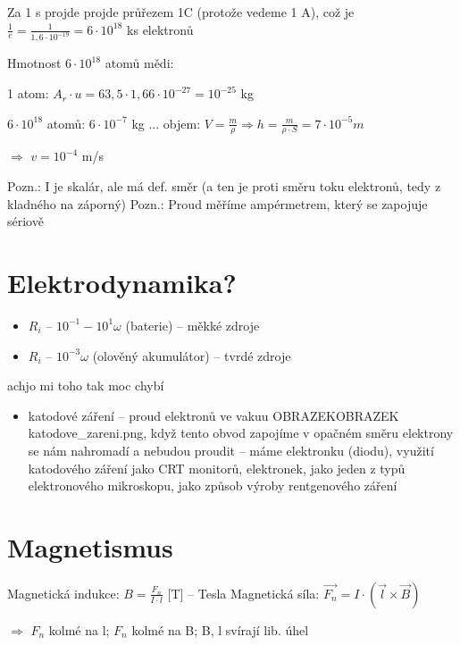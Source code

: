 \documentclass{article}
\begin{document}
Za 1 s projde projde průřezem 1C (protože vedeme 1 A), což je $\frac{1}{e} = \frac{1}{1,6\cdot 10^{-19}} = 6\cdot 10^{18}$ ks elektronů

Hmotnost $6\cdot10^{18}$ atomů mědi:

  \hspace{10 pt} 1 atom: $A_r \cdot u = 63,5 \cdot 1,66 \cdot 10^{-27} = 10^{-25}$ kg

  \hspace{10 pt} $6 \cdot 10^{18}$ atomů: $6 \cdot 10^{-7}$ kg ... objem: $V = \frac{m}{\rho} \Rightarrow h = \frac{m}{\rho \cdot S} = 7 \cdot 10^{-5} m$

\hspace{-10 pt} $\Rightarrow$ $v = 10^{-4} $ m/s

Pozn.: I je skalár, ale má def. směr (a ten je proti směru toku elektronů, tedy z kladného na záporný)
Pozn.: Proud měříme ampérmetrem, který se zapojuje sériově

\part{Elektrodynamika?}
\begin{itemize}
  \item $R_i$ -- $10^{-1} - 10^{1} \omega$ (baterie) -- měkké zdroje
  \item $R_i$ -- $10^{-3} \omega$ (olověný akumulátor) -- tvrdé zdroje
\end{itemize}

achjo mi toho tak moc chybí
\begin{itemize}
  \item katodové záření -- proud elektronů ve vakuu OBRAZEKOBRAZEK katodove\_zareni.png, když tento obvod zapojíme v opačném směru elektrony se nám nahromadí a nebudou proudit -- máme elektronku (diodu), využití katodového záření jako CRT monitorů, elektronek, jako jeden z typů elektronového mikroskopu, jako způsob výroby rentgenového záření
\end{itemize}

\newpage
\part{Magnetismus}

Magnetická indukce: $B = \frac{F_n}{I \cdot l}$ [T] -- Tesla \newline
Magnetická síla: $\overrightarrow{F_n} = I \cdot (\overrightarrow{l} \times \overrightarrow{B})$

$\Rightarrow$ $F_n$ kolmé na l; $F_n$ kolmé na B; B, l svírají lib. úhel
\end{document}
